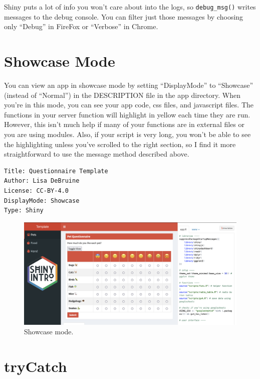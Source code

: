 \documentclass[
]{book}
\begin{document}
Shiny puts a lot of info you won't care about into the logs, so \texttt{debug\_msg()} writes messages to the debug console. You can filter just those messages by choosing only ``Debug'' in FireFox or ``Verbose'' in Chrome.

\hypertarget{showcase-mode}{%
\section{Showcase Mode}\label{showcase-mode}}

You can view an app in showcase mode by setting ``DisplayMode'' to ``Showcase'' (instead of ``Normal'') in the DESCRIPTION file in the app directory. When you're in this mode, you can see your app code, css files, and javascript files. The functions in your server function will highlight in yellow each time they are run. However, this isn't much help if many of your functions are in external files or you are using modules. Also, if your script is very long, you won't be able to see the highlighting unless you've scrolled to the right section, so I find it more straightforward to use the message method described above.

\begin{verbatim}
Title: Questionnaire Template
Author: Lisa DeBruine
License: CC-BY-4.0
DisplayMode: Showcase
Type: Shiny
\end{verbatim}

\begin{figure}

{\centering \includegraphics[width=1\linewidth]{images/showcase_mode} 

}

\caption{Showcase mode.}\label{fig:showcase-mode}
\end{figure}

\hypertarget{trycatch}{%
\section{tryCatch}\label{trycatch}}
\end{document}
